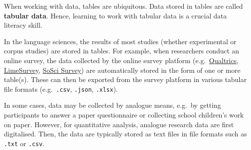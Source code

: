 \documentclass[
  letterpaper,
  DIV=11,
  numbers=noendperiod]{scrreprt}
\begin{document}
\begin{table}

\caption{\label{tbl-EyeTrackingTable}Extract of table containing
eye-tracking data from Schimke et al.~(2018)\textquotesingle s appendix}


\end{table}%

When working with data, tables are ubiquitous. Data stored in tables are
called \textbf{tabular data}. Hence, learning to work with tabular data
is a crucial data literacy skill.

In the language sciences, the results of most studies (whether
experimental or corpus studies) are stored in tables. For example, when
researchers conduct an online survey, the data collected by the online
survey platform (e.g.~\href{https://www.qualtrics.com}{Qualtrics},
\href{https://www.limesurvey.org/}{LimeSurvey},
\href{https://www.soscisurvey.de/}{SoSci Survey}) are automatically
stored in the form of one or more table(s). These can then be exported
from the survey platform in various tabular file formats
(e.g.~\texttt{.csv}, \texttt{.json}, \texttt{.xlsx}).

In some cases, data may be collected by analogue means, e.g.~by getting
participants to answer a paper questionnaire or collecting school
children's work on paper. However, for quantitative analysis, analogue
research data are first digitalised. Then, the data are typically stored
as text files in file formats such as \texttt{.txt} or \texttt{.csv}.
\end{document}
